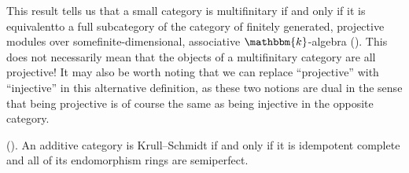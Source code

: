 \noindent\begin{remark}\label{FreydMitchellEquivalence} This result tells us that a small category is multifinitary if and only if it is equivalent\linebreak to a full subcategory of the category of finitely generated, projective modules over some\linebreak finite-dimensional, associative $\mathbbm{k}$-algebra (\cite{MMMTZ23}). This does not necessarily mean that the objects of a multifinitary category are all projective! It may also be worth noting that we can replace ``projective'' with ``injective'' in this alternative definition, as these two notions are dual in the sense that being projective is of course the same as being injective in the opposite category.\\
\end{remark}


\noindent\begin{theorem}\label{KrullSchmidt1}\textup{(\cite[Theorem 11.53]{EMTW20}).} An additive category is Krull--Schmidt if and only if it is idempotent complete and all of its endomorphism rings are semiperfect.\\ %
\end{theorem}


